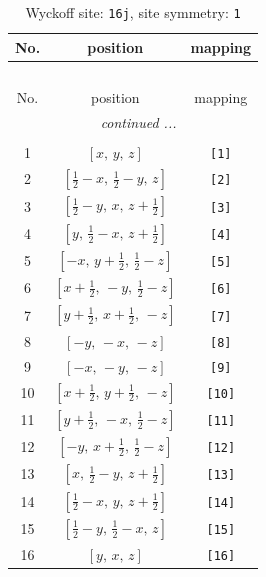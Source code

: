 \documentclass[fleqn,8pt]{jsarticle}
\begin{document}
\begin{longtable}{ccc}
\caption{Wyckoff site: {\tt 16j}, site symmetry: {\tt 1}}
 \\
 \hline \hline
No. & position & mapping \\ \hline \endfirsthead

\multicolumn{2}{l}{\tablename\ \thetable{}} \\
 \hline \hline
No. & position & mapping \\ \hline \endhead

 \hline \hline
\multicolumn{2}{r}{\footnotesize\it continued ...} \\ \endfoot

 \hline \hline
\multicolumn{2}{r}{} \\ \endlastfoot

1 & $\left[ x,\, y,\, z \right]$ & {\tt [1]} \\ \hline
2 & $\left[ \frac{1}{2} - x,\, \frac{1}{2} - y,\, z \right]$ & {\tt [2]} \\ \hline
3 & $\left[ \frac{1}{2} - y,\, x,\, z + \frac{1}{2} \right]$ & {\tt [3]} \\ \hline
4 & $\left[ y,\, \frac{1}{2} - x,\, z + \frac{1}{2} \right]$ & {\tt [4]} \\ \hline
5 & $\left[ - x,\, y + \frac{1}{2},\, \frac{1}{2} - z \right]$ & {\tt [5]} \\ \hline
6 & $\left[ x + \frac{1}{2},\, - y,\, \frac{1}{2} - z \right]$ & {\tt [6]} \\ \hline
7 & $\left[ y + \frac{1}{2},\, x + \frac{1}{2},\, - z \right]$ & {\tt [7]} \\ \hline
8 & $\left[ - y,\, - x,\, - z \right]$ & {\tt [8]} \\ \hline
9 & $\left[ - x,\, - y,\, - z \right]$ & {\tt [9]} \\ \hline
10 & $\left[ x + \frac{1}{2},\, y + \frac{1}{2},\, - z \right]$ & {\tt [10]} \\ \hline
11 & $\left[ y + \frac{1}{2},\, - x,\, \frac{1}{2} - z \right]$ & {\tt [11]} \\ \hline
12 & $\left[ - y,\, x + \frac{1}{2},\, \frac{1}{2} - z \right]$ & {\tt [12]} \\ \hline
13 & $\left[ x,\, \frac{1}{2} - y,\, z + \frac{1}{2} \right]$ & {\tt [13]} \\ \hline
14 & $\left[ \frac{1}{2} - x,\, y,\, z + \frac{1}{2} \right]$ & {\tt [14]} \\ \hline
15 & $\left[ \frac{1}{2} - y,\, \frac{1}{2} - x,\, z \right]$ & {\tt [15]} \\ \hline
16 & $\left[ y,\, x,\, z \right]$ & {\tt [16]} \\
\end{longtable}
\end{document}
